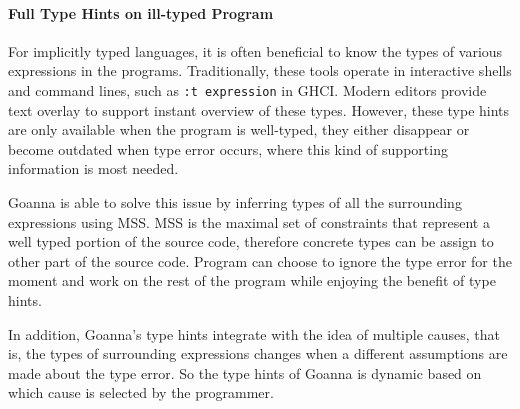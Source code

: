 \documentclass[pdflatex,sn-mathphys-num]{sn-jnl}%
\begin{document}

    
    \paragraph{Full Type Hints on ill-typed Program}
    For implicitly typed languages, it is often beneficial to know the types of various expressions in the programs. Traditionally, these tools operate in interactive shells and command lines, such as \texttt{:t expression} in GHCI. Modern editors provide text overlay to support instant overview of these types. However, these type hints are only available when the program is well-typed, they either disappear or become outdated when type error occurs, where this kind of supporting information is most needed.

    Goanna is able to solve this issue by inferring types of all the surrounding expressions using MSS. MSS is the maximal set of constraints that represent a well typed portion of the source code, therefore concrete types can be assign to other part of the source code. Program can choose to ignore the type error for the moment and work on the rest of the program while enjoying the benefit of type hints.

    In addition, Goanna's type hints integrate with the idea of multiple causes, that is, the types of surrounding expressions changes when a different assumptions are made about the type error. So the type hints of Goanna is dynamic based on which cause is selected by the programmer.
\end{document}
